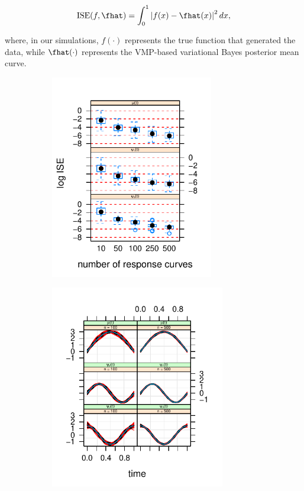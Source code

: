 \documentclass[12pt]{article}
\theoremstyle{plain}
\theoremstyle{definition}
\theoremstyle{remark}
\begin{document}
\begin{equation}
	\text{ISE} (f, \fhat) = \int_0^1 \left| f (x) - \fhat(x) \right|^2 dx,
\label{ise}
\end{equation}

\noindent where, in our simulations, $f (\cdot)$ represents the true function that generated the data, while $\fhat (\cdot)$
represents the VMP-based variational Bayes posterior mean curve.

\begin{figure}
	\centering
	\begin{subfigure}[t]{0.49\textwidth}
		\centering
		\includegraphics[width=2.8in]{images/box_plot_sims.pdf}
	\caption{}
	\label{subfig:bf_accs}
	\end{subfigure}
	\begin{subfigure}[t]{0.49\textwidth}
		\centering
		\includegraphics[width=3in]{images/panel_plot.pdf}

\end{subfigure}
\end{figure}
\end{document}
